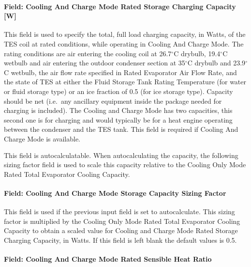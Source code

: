 \paragraph{Field: Cooling And Charge Mode Rated Storage Charging Capacity {[}W{]}}\label{field-cooling-and-charge-mode-rated-storage-charging-capacity-w}

This field is used to specify the total, full load charging capacity, in Watts, of the TES coil at rated conditions, while operating in Cooling And Charge Mode. The rating conditions are air entering the cooling coil at 26.7$^\circ$C drybulb, 19.4$^\circ$C wetbulb and air entering the outdoor condenser section at 35$^\circ$C drybulb and 23.9$^\circ$C wetbulb, the air flow rate specified in Rated Evaporator Air Flow Rate, and the state of TES at either the Fluid Storage Tank Rating Temperature (for water or fluid storage type) or an ice fraction of 0.5 (for ice storage type). Capacity should be net (i.e.~any ancillary equipment inside the package needed for charging is included). The Cooling and Charge Mode has two capacities, this second one is for charging and would typically be for a heat engine operating between the condenser and the TES tank. This field is required if Cooling And Charge Mode is available.

This field is autocalculatable. When autocalculating the capacity, the following sizing factor field is used to scale this capacity relative to the Cooling Only Mode Rated Total Evaporator Cooling Capacity.

\paragraph{Field: Cooling And Charge Mode Storage Capacity Sizing Factor}\label{field-cooling-and-charge-mode-storage-capacity-sizing-factor}

This field is used if the previous input field is set to autocalculate. This sizing factor is multiplied by the Cooling Only Mode Rated Total Evaporator Cooling Capacity to obtain a scaled value for Cooling and Charge Mode Rated Storage Charging Capacity, in Watts. If this field is left blank the default values is 0.5.

\paragraph{Field: Cooling And Charge Mode Rated Sensible Heat Ratio}\label{field-cooling-and-charge-mode-rated-sensible-heat-ratio}

